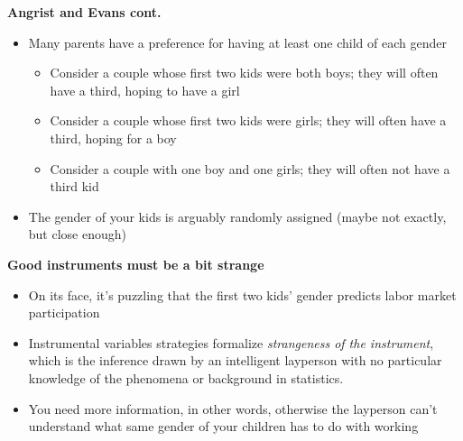 \documentclass[notes=show]{beamer}
\begin{document}
\begin{frame}[plain]

\begin{center}
\textbf{Angrist and Evans cont.}
\end{center}

\begin{itemize}

		\item Many parents have a preference for having at least one child of each gender
			\begin{itemize}	
			\item Consider a couple whose first two kids were both boys; they will often have a third, hoping to have a girl
			\item Consider a couple whose first two kids were girls; they will often have a third, hoping for a boy
			\item Consider a couple with one boy and one girls; they will often not have a third kid
			\end{itemize}
		\item The gender of your kids is arguably randomly assigned (maybe not exactly, but close enough)
		\end{itemize}

\end{frame}



\begin{frame}[plain]
\begin{center}
\textbf{Good instruments must be a bit strange}
\end{center}

\begin{itemize}
		\item On its face, it's puzzling that the first two kids' gender predicts labor market participation
		\item Instrumental variables strategies formalize \emph{strangeness of the instrument}, which is the inference drawn by an intelligent layperson with no particular knowledge of the phenomena or background in statistics.
		\item You need more information, in other words, otherwise the layperson can't understand what same gender of your children has to do with working
\end{itemize}

\end{frame}
\end{document}
